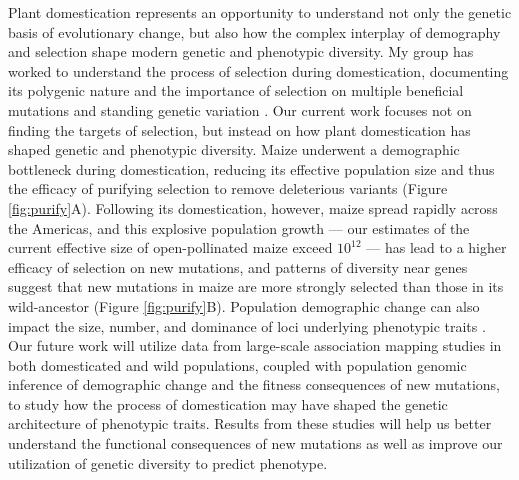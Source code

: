 \documentclass[11pt,letterpaper]{article}
\begin{document}
Plant domestication represents an opportunity to understand not only the genetic basis of evolutionary change, but also how the complex interplay of demography and selection shape modern genetic and phenotypic diversity.
My group has worked to understand the process of selection during domestication, documenting its polygenic nature \citep{hufford2012comparative} and the importance of selection on multiple beneficial mutations \citep{wills2013many} and standing genetic variation \citep{wills2013many, studer2011identification}. 
Our current work focuses not on finding the targets of selection, but instead on how plant domestication has shaped genetic and phenotypic diversity.
Maize underwent a demographic bottleneck during domestication, reducing its effective population size and thus the efficacy of purifying selection to remove deleterious variants (Figure \ref{fig:purify}A).
Following its domestication, however, maize spread rapidly across the Americas, and this explosive population growth --- our estimates of the current effective size of open-pollinated maize exceed $10^{12}$ --- has lead to a higher efficacy of selection on new mutations, and patterns of diversity near genes suggest that new mutations in maize are more strongly selected than those in its wild-ancestor (Figure \ref{fig:purify}B).
Population demographic change can also impact the size, number, and dominance of loci underlying phenotypic traits \citep{lohmueller2014impact,gazave2013population}.
Our future work will utilize data from large-scale association mapping studies in both domesticated and wild populations, coupled with population genomic inference of demographic change and the fitness consequences of new mutations, to study how the process of domestication may have shaped the genetic architecture of phenotypic traits.
Results from these studies will help us better understand the functional consequences of new mutations as well as improve our utilization of genetic diversity to predict phenotype.
\end{document}

